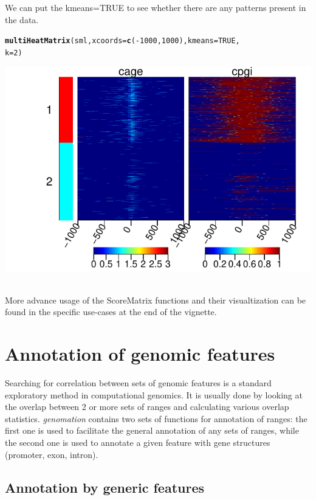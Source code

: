\documentclass{article}\usepackage[]{graphicx}\usepackage[]{color}
\makeatletter
\newcommand{\hlnum}[1]{\textcolor[rgb]{0.686,0.059,0.569}{#1}}%
\newcommand{\hlopt}[1]{\textcolor[rgb]{0,0,0}{#1}}%
\newcommand{\hlstd}[1]{\textcolor[rgb]{0.345,0.345,0.345}{#1}}%
\newcommand{\hlkwc}[1]{\textcolor[rgb]{0.333,0.667,0.333}{#1}}%
\newcommand{\hlkwd}[1]{\textcolor[rgb]{0.737,0.353,0.396}{\textbf{#1}}}%
\newenvironment{kframe}{%
 \def\at@end@of@kframe{}%
 \ifinner\ifhmode%
  \def\at@end@of@kframe{\end{minipage}}%
  \begin{minipage}{\columnwidth}%
 \fi\fi%
 \def\FrameCommand##1{\hskip\@totalleftmargin \hskip-\fboxsep
 \colorbox{shadecolor}{##1}\hskip-\fboxsep
     \hskip-\linewidth \hskip-\@totalleftmargin \hskip\columnwidth}%
 \MakeFramed {\advance\hsize-\width
   \@totalleftmargin\z@ \linewidth\hsize
   \@setminipage}}%
 {\par\unskip\endMakeFramed%
 \at@end@of@kframe}
\newenvironment{knitrout}{}{} %
\newcommand{\Rpackage}[1]{{\textit{#1}}}
\makeatother
\begin{document}
We can put the kmeans=TRUE to see whether there are any patterns present in the data.
\begin{knitrout}
\color{fgcolor}\begin{kframe}
\begin{alltt}
\hlkwd{multiHeatMatrix}\hlstd{(sml,} \hlkwc{xcoords} \hlstd{=} \hlkwd{c}\hlstd{(}\hlopt{-}\hlnum{1000}\hlstd{,} \hlnum{1000}\hlstd{),} \hlkwc{kmeans} \hlstd{=} \hlnum{TRUE}\hlstd{,}
    \hlkwc{k} \hlstd{=} \hlnum{2}\hlstd{)}
\end{alltt}
\end{kframe}

{\centering \includegraphics[width=.49\linewidth]{inst/doc/FiguresmultiHeatMatrix2} 

}



\end{knitrout}


\\
More advance usage of the ScoreMatrix functions and their visualtization can be found in the specific
use-cases at the end of the vignette.
\newpage

\section{Annotation of genomic features}


Searching for correlation between sets of genomic features is a standard exploratory
method in computational genomics. It is usually done by looking at the overlap between 
2 or more sets of ranges and calculating various overlap statistics. 
\Rpackage{genomation} contains two sets of functions for annotation of ranges:
the first one is used to facilitate the general annotation of any sets of ranges,
while
the second one is used to annotate a given feature with gene structures (promoter, 
exon, intron).


\subsection{Annotation by generic features}
\end{document}
